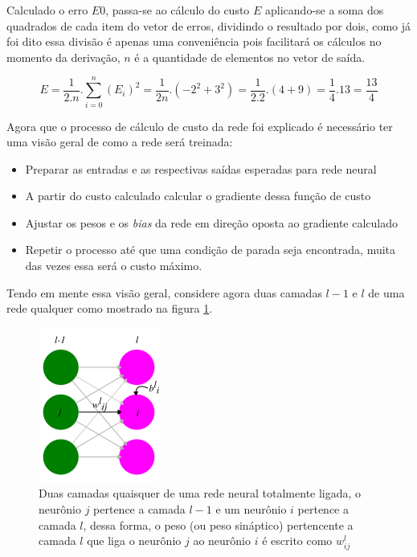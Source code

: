 \begin{apendicesenv}
	\par Calculado o erro $E0$, passa-se ao cálculo do custo $E$ aplicando-se a soma dos quadrados de cada item do vetor de erros, dividindo o resultado por dois, como já foi dito essa divisão é apenas uma conveniência pois facilitará os cálculos no momento da derivação, $n$ é a quantidade de elementos no vetor de saída.
	
	\begin{equation}\label{eq:averageQuadError}
		E = \dfrac{1}{2.n}. \sum_{i=0}^{n}  (E_i)^2 = \dfrac{1}{2n} . (-2^2 + 3^2)  = \dfrac{1}{2.2} . (4 + 9) = \dfrac{1}{4} . 13 = \dfrac{13}{4} 
	\end{equation}


	\par Agora que o processo de cálculo de custo da rede foi explicado é necessário ter uma visão geral de como a rede será treinada:
	
	\begin{itemize}
		\item Preparar as entradas e as respectivas saídas esperadas para rede neural
		\item A partir do custo calculado calcular o gradiente dessa função de custo
		\item Ajustar os pesos e os \textit{bias} da rede em direção oposta ao gradiente calculado
		\item Repetir o processo até que uma condição de parada seja encontrada, muita das vezes essa será o custo máximo.
	\end{itemize}
	
	\par Tendo em mente essa visão geral, considere agora duas camadas $l - 1$ e $l$ de uma rede qualquer como mostrado na figura \ref{fig:layers}.
	
	\begin{figure}[H]
		\centering
		\caption[Camadas de uma rede neural]{Duas camadas quaisquer de uma rede neural totalmente ligada, o neurônio $j$ pertence a camada $l -1$ e um neurônio $i$ pertence a camada $l$, dessa forma, o peso (ou peso sináptico) pertencente a camada $l$ que liga o neurônio $j$ ao neurônio $i$ é escrito como $w^l_{ij}$ }
		\label{fig:layers}
		\includegraphics[width=0.5\linewidth]{images/layers}
	\end{figure}


\end{apendicesenv}
